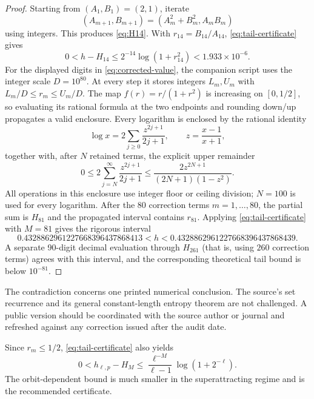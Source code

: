 \begin{proof}
Starting from $(A_1,B_1)=(2,1)$, iterate
\[
 (A_{m+1},B_{m+1})=(A_m^2+B_m^2,A_mB_m)
\]
using integers.  This produces \cref{eq:H14}.  With
$r_{14}=B_{14}/A_{14}$, \cref{eq:tail-certificate} gives
\[
 0<h-H_{14}\le2^{-14}\log(1+r_{14}^2)<1.933\times10^{-6}.
\]
For the displayed digits in \cref{eq:corrected-value}, the companion script
uses the integer scale $D=10^{80}$.  At every step it stores integers
$L_m,U_m$ with $L_m/D\le r_m\le U_m/D$.  The map
$f(r)=r/(1+r^2)$ is increasing on $[0,1/2]$, so evaluating its rational
formula at the two endpoints and rounding down/up propagates a valid
enclosure.  Every logarithm is enclosed by the rational identity
\[
 \log x=2\sum_{j\ge0}\frac{z^{2j+1}}{2j+1},
 \qquad z=\frac{x-1}{x+1},
\]
together with, after $N$ retained terms, the explicit upper remainder
\[
 0\le 2\sum_{j=N}^{\infty}\frac{z^{2j+1}}{2j+1}
 \le \frac{2z^{2N+1}}{(2N+1)(1-z^2)}.
\]
All operations in this enclosure use integer floor or ceiling division;
$N=100$ is used for every logarithm.  After the $80$ correction terms
$m=1,\ldots,80$, the partial sum is $H_{81}$ and the propagated interval
contains $r_{81}$.  Applying \cref{eq:tail-certificate} with $M=81$ gives
the rigorous interval
\[
 0.4328862961227668396437868413
 <h<
 0.4328862961227668396437868439.
\]
A separate 90-digit decimal evaluation through $H_{261}$ (that is, using
$260$ correction terms) agrees with this interval, and the corresponding
theoretical tail bound is below $10^{-81}$.
\end{proof}

\begin{remark}
The contradiction concerns one printed numerical conclusion.  The source's
set recurrence and its general constant-length entropy theorem are not
challenged.  A public version should be coordinated with the source author or
journal and refreshed against any correction issued after the audit date.
\end{remark}

\begin{remark}
Since $r_m\le1/2$, \cref{eq:tail-certificate} also yields
\[
 0<h_{\ell,p}-H_M
 \le\frac{\ell^{-M}}{\ell-1}\log(1+2^{-\ell}).
\]
The orbit-dependent bound is much smaller in the superattracting regime and
is the recommended certificate.
\end{remark}
